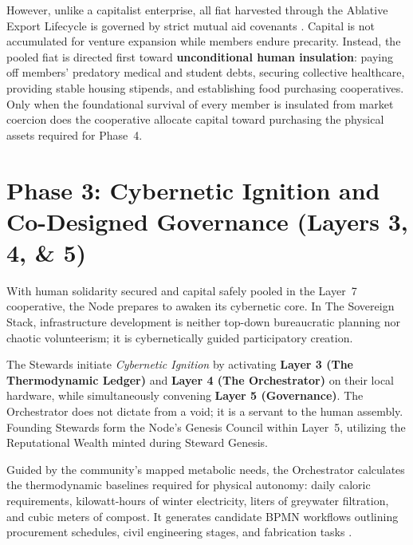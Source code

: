 However, unlike a capitalist enterprise, all fiat harvested through the Ablative Export Lifecycle is governed by strict mutual aid covenants \parencite{kropotkin1902}. Capital is not accumulated for venture expansion while members endure precarity. Instead, the pooled fiat is directed first toward \textbf{unconditional human insulation}: paying off members' predatory medical and student debts, securing collective healthcare, providing stable housing stipends, and establishing food purchasing cooperatives. Only when the foundational survival of every member is insulated from market coercion does the cooperative allocate capital toward purchasing the physical assets required for Phase~4.

\section[Phase 3: Cybernetic Ignition and Governance]{Phase 3: Cybernetic Ignition and Co-Designed Governance (Layers 3, 4, \& 5)}

With human solidarity secured and capital safely pooled in the Layer~7 cooperative, the Node prepares to awaken its cybernetic core. In The Sovereign Stack, infrastructure development is neither top-down bureaucratic planning nor chaotic volunteerism; it is cybernetically guided participatory creation.

The Stewards initiate \textit{Cybernetic Ignition} by activating \textbf{Layer 3 (The Thermodynamic Ledger)} and \textbf{Layer 4 (The Orchestrator)} on their local hardware, while simultaneously convening \textbf{Layer 5 (Governance)}. The Orchestrator does not dictate from a void; it is a servant to the human assembly. Founding Stewards form the Node's Genesis Council within Layer~5, utilizing the Reputational Wealth minted during Steward Genesis.

Guided by the community's mapped metabolic needs, the Orchestrator calculates the thermodynamic baselines required for physical autonomy: daily caloric requirements, kilowatt-hours of winter electricity, liters of greywater filtration, and cubic meters of compost. It generates candidate BPMN workflows outlining procurement schedules, civil engineering stages, and fabrication tasks \parencite{omg2011bpmn}.

